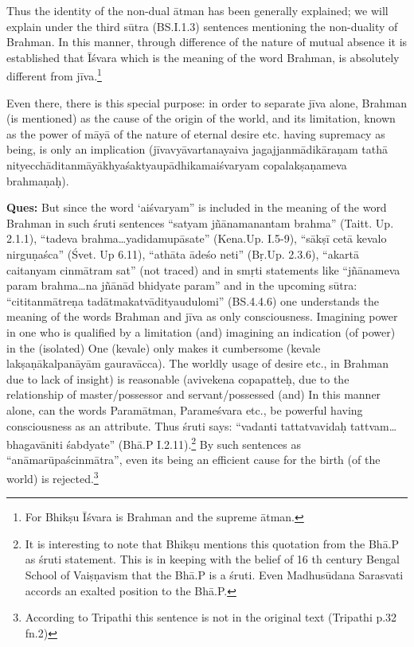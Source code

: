Thus the identity of the non-dual ātman has been generally explained; we will explain under the third sūtra (BS.I.1.3) sentences mentioning the non-duality of Brahman. In this manner, through difference of the nature of mutual absence it is established that Īśvara which is the meaning of the word Brahman, is absolutely different from jīva.\footnote{For Bhikṣu Īśvara is Brahman and the supreme ātman.} 

Even there, there is this special purpose: in order to separate jīva alone, Brahman (is mentioned) as the cause of the origin of the world, and its limitation, known as the power of māyā of the nature of eternal desire etc. having supremacy as being, is only an implication (jīvavyāvartanayaiva jagajjanmādikāraṇam tathā nityecchāditanmāyākhyaśak\-\break\hbox{tyau\-pādhikamaiśvaryam} copalakṣaṇameva brahmaṇaḥ).

\textbf{Ques:} But since the word ‘aiśvaryam” is included in the meaning of the word Brahman in such śruti sentences “satyam jñānamanantam brahma” (Taitt. Up. 2.1.1), “tadeva brahma…yadidamupāsate”  (Kena.\break Up. I.5-9), “sākṣī cetā kevalo nirguṇaśca” (Śvet. Up 6.11), “athāta ādeśo neti” (Bṛ.Up. 2.3.6), “akartā caitanyam cinmātram sat” (not traced) and in smṛti statements like “jñānameva param brahma…na jñānād bhidyate param” and in the upcoming sūtra: “cititanmātreṇa tadātmakatvādityaudulomi” (BS.4.4.6) one understands the meaning of the words Brahman and jīva as only consciousness. Imagining power in one who  is qualified by a limitation (and) imagining an indication (of power) in the (isolated) One (kevale) only makes it cumbersome (kevale lakṣaṇākalpanāyām gauravācca). The worldly usage of desire etc., in Brahman due to lack of insight) is reasonable (avivekena copapatteḥ, due to the relationship of master/possessor and servant/possessed (and) In this manner alone, can the words Paramātman, Parameśvara etc., be powerful having consciousness as an attribute. Thus śruti says: “vadanti tattatvavidaḥ tattvam…bhagavāniti śabdyate” (Bhā.P I.2.11).\footnote{It is interesting to note that Bhikṣu mentions this quotation from the Bhā.P as śruti statement. This is in keeping with the belief of 16 th century Bengal School of Vaiṣṇavism that the Bhā.P is a śruti. Even Madhusūdana Sarasvati accords an exalted position to the Bhā.P.} By such sentences as “anāmarūpaścinmātra”, even its being an efficient cause for the birth (of the world) is rejected.\footnote{According to Tripathi this sentence is not in the original text (Tripathi p.32 fn.2)} 

